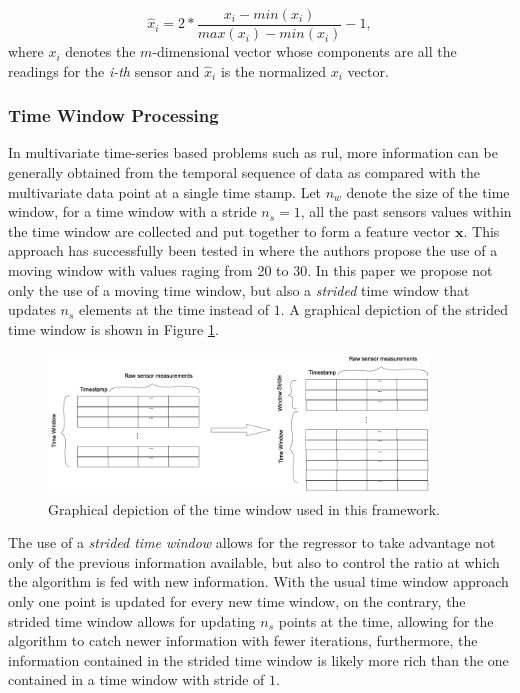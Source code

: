 \documentclass{article}
\begin{document}
\begin{equation}
\hat{x}_i = 2* \frac{x_i - min(x_i)}{max(x_i) - min(x_i)} - 1,
\label{eq:min_max_norm}
\end{equation}
where $x_i$ denotes the $m$-dimensional vector whose components are all the readings for the \textit{i-th} sensor and $\hat{x}_i$ is the normalized $x_i$ vector.

\subsubsection{Time Window Processing}

In multivariate time-series based problems such as \gls{rul}, more information can be generally obtained from the temporal sequence of data as compared with the multivariate data point at a single time stamp. Let $n_w$ denote the size of the time window, for a time window with a stride $n_s = 1$, all the past sensors values within the time window are collected and put together to form a feature vector $\mathbf{x}$. This approach has successfully been tested in \cite{Li2018, Lim2016} where the authors propose the use of a moving window with values raging from 20 to 30. In this paper we propose not only the use of a moving time window, but also a \textit{strided} time window that updates $n_s$ elements at the time instead of $1$. A graphical depiction of the strided time window is shown in Figure \ref{fig:time_window}.

\begin{figure}[!htb]
\centering
\includegraphics[width=0.9\textwidth]{../img/time_window.png}
\caption{Graphical depiction of the time window used in this framework.}
\label{fig:time_window}
\end{figure}

The use of a \textit{strided time window} allows for the regressor to take advantage not only of the previous information available, but also to control the ratio at which the algorithm is fed with new information. With the usual time window approach only one point is updated for every new time window, on the contrary, the strided time window allows for updating $n_s$ points at the time, allowing for the algorithm to catch newer information with fewer iterations, furthermore, the information contained in the strided time window is likely more rich than the one contained in a time window with stride of $1$.
\end{document}
